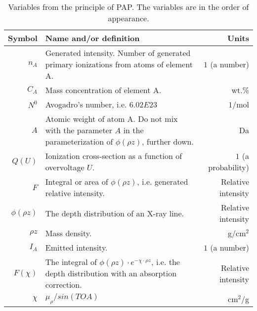 \begin{table}[phtb]
    \begin{center}
        \caption{
            Variables from the principle of PAP.
            The variables are in the order of appearance.
        }
        \label{tab:quantitative:PAP:variables:principle}
        \begin{tabular}{rp{9cm}r}
            \hline
            \textbf{Symbol} & \textbf{Name and/or definition}                                                                                          & \textbf{Units}     \\

            \hline
            $n_A$           & Generated intensity. Number of generated primary ionizations from atoms of element A.                                    & $1$ (a number)       \\
            $C_A$           & Mass concentration of element A.                                                                                         & wt.\%              \\
            $N^0$           & Avogadro's number, i.e. $6.02E23$                                                                                        & $1$/mol              \\
            $A$             & Atomic weight of atom A. Do not mix with the parameter $A$ in the parameterization of $\phi(\rho z)$, further down.      & Da                 \\
            $Q(U)$          & Ionization cross-section as a function of overvoltage $U$.                                                               & $1$ (a probability)  \\
            $F$             & Integral or area of $\phi(\rho z)$, i.e. generated relative intensity.                                                   & Relative intensity \\
            $\phi(\rho z)$  & The depth distribution of an X-ray line.                                                                                 & Relative intensity \\
            $\rho z$        & Mass density.                                                                                                            & g/cm$^2$           \\
            $I_A$           & Emitted intensity.                                                                                                       & $1$ (a number)       \\
            $F(\chi)$       & The integral of $\phi (\rho z) \cdot e^{-\chi \cdot \rho z}$, i.e. the depth distribution with an absorption correction. & Relative intensity \\
            $\chi$          & $ \mu_\rho / sin(TOA) $                                                                                                  & cm$^2$/g           \\
            \hline
        \end{tabular}
    \end{center}
\end{table}
